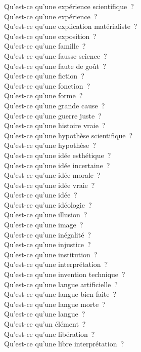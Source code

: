 \documentclass[a4paper,12pt]{article}
\begin{document}
Qu'est-ce qu'une expérience scientifique ? \\
Qu'est-ce qu'une expérience ? \\
Qu'est-ce qu'une explication matérialiste ? \\
Qu'est-ce qu'une exposition ? \\
Qu'est-ce qu'une famille ? \\
Qu'est-ce qu'une fausse science ? \\
Qu'est-ce qu'une faute de goût ? \\
Qu'est-ce qu'une fiction ? \\
Qu'est-ce qu'une fonction ? \\
Qu'est-ce qu'une forme ? \\
Qu'est-ce qu'une grande cause ? \\
Qu'est-ce qu'une guerre juste ? \\
Qu'est-ce qu'une histoire vraie ? \\
Qu'est-ce qu'une hypothèse scientifique ? \\
Qu'est-ce qu'une hypothèse ? \\
Qu'est-ce qu'une idée esthétique ? \\
Qu'est-ce qu'une idée incertaine ? \\
Qu'est-ce qu'une idée morale ? \\
Qu'est-ce qu'une idée vraie ? \\
Qu'est-ce qu'une idée ? \\
Qu'est-ce qu'une idéologie ? \\
Qu'est-ce qu'une illusion ? \\
Qu'est-ce qu'une image ? \\
Qu'est-ce qu'une inégalité ? \\
Qu'est-ce qu'une injustice ? \\
Qu'est-ce qu'une institution ? \\
Qu'est-ce qu'une interprétation ? \\
Qu'est-ce qu'une invention technique ? \\
Qu'est-ce qu'une langue artificielle ? \\
Qu'est-ce qu'une langue bien faite ? \\
Qu'est-ce qu'une langue morte ? \\
Qu'est-ce qu'une langue ? \\
Qu'est-ce qu'un élément ? \\
Qu'est-ce qu'une libération ? \\
Qu'est-ce qu'une libre interprétation ? \\
\end{document}
